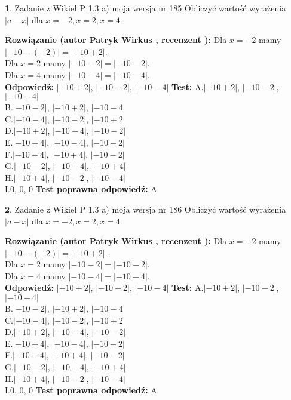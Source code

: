 \documentclass[12pt, a4paper]{article}
\theoremstyle{definition} %
\newtheorem{zad}{}
\newcommand{\zadStart}[1]{\begin{zad}#1\newline}
\newcommand{\zadStop}{\end{zad}}
\newcommand{\rozwStart}[2]{\noindent \textbf{Rozwiązanie (autor #1 , recenzent #2): }\newline}
\newcommand{\rozwStop}{\newline}
\newcommand{\odpStart}{\noindent \textbf{Odpowiedź:}\newline}
\newcommand{\odpStop}{\newline}
\newcommand{\testStart}{\noindent \textbf{Test:}\newline}
\newcommand{\testStop}{\newline}
\newcommand{\kluczStart}{\noindent \textbf{Test poprawna odpowiedź:}\newline}
\newcommand{\kluczStop}{\newline}
\begin{document}
\zadStart{Zadanie z Wikieł P 1.3 a) moja wersja nr 185}
Obliczyć wartość wyrażenia $|a - x|$ dla $x=-2,x=2,x=4$.
\zadStop
\rozwStart{Patryk Wirkus}{}
Dla $x = -2$ mamy $|-10 - (-2)| = |-10 + 2|$.\\
Dla $x = 2$ mamy $|-10 - 2| = |-10 - 2|$.\\
Dla $x = 4$ mamy $|-10 - 4| = |-10 - 4|$.\\
\rozwStop
\odpStart
$|-10 + 2|$, $|-10 - 2|$, $|-10 - 4|$
\odpStop
\testStart
A.$|-10 + 2|$, $|-10 - 2|$, $|-10 - 4|$\\
B.$|-10 - 2|$, $|-10 + 2|$, $|-10 - 4|$\\
C.$|-10 - 4|$, $|-10 - 2|$, $|-10 + 2|$\\
D.$|-10 + 2|$, $|-10 - 4|$, $|-10 - 2|$\\
E.$|-10 + 4|$, $|-10 - 4|$, $|-10 - 2|$\\
F.$|-10 - 4|$, $|-10 + 4|$, $|-10 - 2|$\\
G.$|-10 - 2|$, $|-10 - 4|$, $|-10 + 4|$\\
H.$|-10 + 4|$, $|-10 - 2|$, $|-10 - 4|$\\
I.$0$, $0$, $0$
\testStop
\kluczStart
A
\kluczStop



\zadStart{Zadanie z Wikieł P 1.3 a) moja wersja nr 186}
Obliczyć wartość wyrażenia $|a - x|$ dla $x=-2,x=2,x=4$.
\zadStop
\rozwStart{Patryk Wirkus}{}
Dla $x = -2$ mamy $|-10 - (-2)| = |-10 + 2|$.\\
Dla $x = 2$ mamy $|-10 - 2| = |-10 - 2|$.\\
Dla $x = 4$ mamy $|-10 - 4| = |-10 - 4|$.\\
\rozwStop
\odpStart
$|-10 + 2|$, $|-10 - 2|$, $|-10 - 4|$
\odpStop
\testStart
A.$|-10 + 2|$, $|-10 - 2|$, $|-10 - 4|$\\
B.$|-10 - 2|$, $|-10 + 2|$, $|-10 - 4|$\\
C.$|-10 - 4|$, $|-10 - 2|$, $|-10 + 2|$\\
D.$|-10 + 2|$, $|-10 - 4|$, $|-10 - 2|$\\
E.$|-10 + 4|$, $|-10 - 4|$, $|-10 - 2|$\\
F.$|-10 - 4|$, $|-10 + 4|$, $|-10 - 2|$\\
G.$|-10 - 2|$, $|-10 - 4|$, $|-10 + 4|$\\
H.$|-10 + 4|$, $|-10 - 2|$, $|-10 - 4|$\\
I.$0$, $0$, $0$
\testStop
\kluczStart
A
\kluczStop
\end{document}
